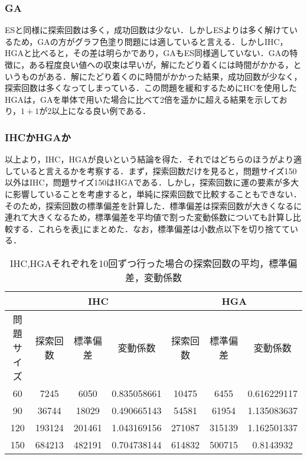 \documentclass[a4j]{jarticle}
\begin{document}
\subsubsection*{GA}
ESと同様に探索回数は多く，成功回数は少ない．しかしESよりは多く解けているため，GAの方がグラフ色塗り問題には適していると言える．しかしIHC，HGAと比べると，その差は明らかであり，GAもES同様適していない．GAの特徴に，ある程度良い値への収束は早いが，解にたどり着くには時間がかかる，というものがある．解にたどり着くのに時間がかかった結果，成功回数が少なく，探索回数は多くなってしまっている．この問題を緩和するためにHCを使用したHGAは，GAを単体で用いた場合に比べて2倍を遥かに超える結果を示しており，$1+1$が2以上になる良い例である．

\subsubsection*{IHCかHGAか}
以上より，IHC，HGAが良いという結論を得た．それではどちらのほうがより適していると言えるかを考察する．まず，探索回数だけを見ると，問題サイズ150以外はIHC，問題サイズ150はHGAである．しかし，探索回数に運の要素が多大に影響していることを考慮すると，単純に探索回数で比較することもできない．そのため，探索回数の標準偏差を計算した．標準偏差は探索回数が大きくなるに連れて大きくなるため，標準偏差を平均値で割った変動係数についても計算し比較する．これらを表\ref{ave10}にまとめた．なお，標準偏差は小数点以下を切り捨てている．
 \begin{table}[H]
  \begin{center}
   \caption{IHC,HGAそれぞれを10回ずつ行った場合の探索回数の平均，標準偏差，変動係数}
   \label{ave10}
   \begin{tabular}[t]{|c||c|c|c|c|c|c|} \hline
     & \multicolumn{3}{|c|}{IHC} & \multicolumn{3}{|c|}{HGA}  \\\hline
問題サイズ & 探索回数 & 標準偏差 & 変動係数 & 探索回数 & 標準偏差 & 変動係数 \\\hline\hline
60 & 7245 & 6050 & 0.835058661 & 10475 & 6455 & 0.616229117 \\\hline
90 & 36744 & 18029 & 0.490665143 & 54581 & 61954 & 1.135083637 \\\hline
120 & 193124 & 201461 & 1.043169156 & 271087 & 315139 & 1.162501337 \\\hline
150 & 684213 & 482191 & 0.704738144 & 614832 & 500715 & 0.8143932 \\\hline
   \end{tabular}
  \end{center}
 \end{table}
\end{document}
